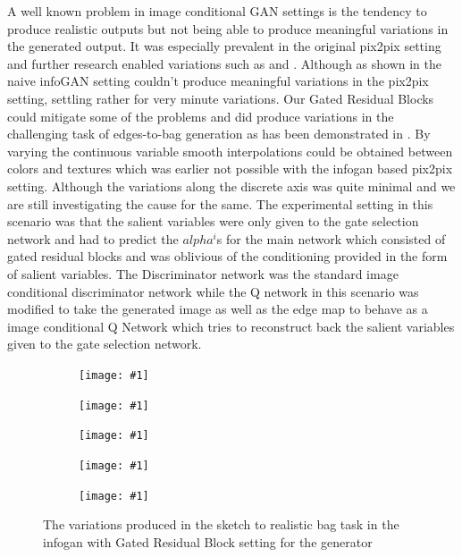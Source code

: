 A well known problem in image conditional GAN settings is the tendency to produce realistic outputs but not being able to produce meaningful variations in the generated output. It was especially prevalent in the original pix2pix setting \cite{isola2016image2image} and further research enabled variations such as \cite{ghosh2017multi} and \cite{zhu2017toward}. Although as shown in \cite{ghosh2017multi} the naive infoGAN setting couldn't produce meaningful variations in the pix2pix setting, settling rather for very minute variations. Our Gated Residual Blocks could mitigate some of the problems and did produce variations in the challenging task of edges-to-bag generation as has been demonstrated in . By varying the continuous variable smooth interpolations could be obtained between colors and textures which was earlier not possible with the infogan based pix2pix setting. Although the variations along the discrete axis was quite minimal and we are still investigating the cause for the same. The experimental setting in this scenario was that the salient variables were only given to the gate selection network and had to predict the $alpha^i$s for the main network which consisted of gated residual blocks and was oblivious of the conditioning provided in the form of salient variables. The Discriminator network was the standard image conditional discriminator network while the Q network in this scenario was modified to take the generated image as well as the edge map to behave as a image conditional Q Network which tries to reconstruct back the salient variables given to the gate selection network. 

\newcommand{\addSubFigEighth}[3]{\begin{subfigure}[t]{.18\linewidth}
   \texttt{[image: \#1]}
   \caption{#2}\label{#3}\end{subfigure}
}
\newcommand{\addSubFigEighthCaptionless}[3]{\begin{subfigure}[t]{.18\linewidth}
   \texttt{[image: \#1]}
   \label{#2}\end{subfigure}
}
\begin{figure}[t]%
    \centering
    \addSubFigEighthCaptionless{Picture8}{Sketch}{fig:bag_sketch} 
    \addSubFigEighthCaptionless{Picture9}{Varition 1}{fig:bag_1} 
    \addSubFigEighthCaptionless{Picture10}{Varition 2}{fig:bag_2}
    \addSubFigEighthCaptionless{Picture11}{Varition 3}{fig:bag_3}
    \addSubFigEighthCaptionless{Picture12}{Varition 4}{fig:bag_4}
    \caption{The variations produced in the sketch to realistic bag task in the infogan with Gated Residual Block setting for the generator }
    \label{fig:infogan_bags}
    \vspace{-3mm}
\end{figure}

